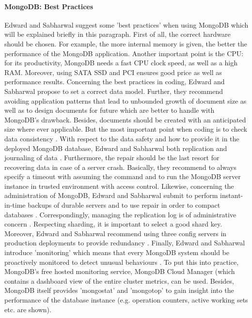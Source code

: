 \paragraph{MongoDB: Best Practices}

Edward and Sabharwal suggest some 'best practices' when using MongoDB \cite[p.234 ff.]{mongodb_edward} which will be explained briefly in this paragraph. 
First of all, the correct hardware should be chosen. For example, the more internal memory is given, the better the performance of the MongoDB application. Another important point is the CPU: for its productivity, MongoDB needs a fast \ac{CPU} clock speed, as well as a high \ac{RAM}. Moreover, using SATA SSD and \ac{PCI} ensures good price as well as performance results.
Concerning the best practices in coding, Edward and Sabharwal propose to set a correct data model. Further, they recommend avoiding application patterns that lead to unbounded growth of document size as well as to design documents for future which are better to handle with MongoDB's drawback. Besides, documents should be created with an anticipated size where ever applicable. But the most important point when coding is to check data consistency \cite[p.234 ff.]{mongodb_edward}. 
With respect to the data safety and how to provide it in the deployed MongoDB database, Edward and Sabharwal both replication and journaling of data \cite[p.234 ff.]{mongodb_edward}. Furthermore, the repair should be the last resort for recovering data in case of a server crash. Basically, they recommend to always specify a timeout with assuming the command and to run the MongoDB server instance in trusted environment with access control.
Likewise, concerning the administration of MongoDB, Edward and Sabharwal submit to perform instant-in-time backups of durable servers and to use repair in order to compact databases \cite[p.234 ff.]{mongodb_edward}. Correspondingly, managing the replication log is of administrative concern \cite[p.240 ff.]{mongodb_edward}. 
Respecting sharding, it is important to select a good shard key. Moreover, Edward and Sabharwal recommend using three config servers in production deployments to provide redundancy \cite[p.240 ff.]{mongodb_edward}. 
Finally, Edward and Sabharwal introduce 'monitoring' which means that every MongoDB system should be proactively monitored to detect unusual behaviours \cite[p.240 ff.]{mongodb_edward}. To put this into practice, MongoDB's free hosted monitoring service, MongoDB Cloud Manager (which contains a dashboard view of the entire cluster metrics, can be used. Besides, MongoDB itself provides 'mongostat' and 'mongotop' to gain insight into the performance of the database instance (e.g. operation counters, active working sets etc. are shown). 

